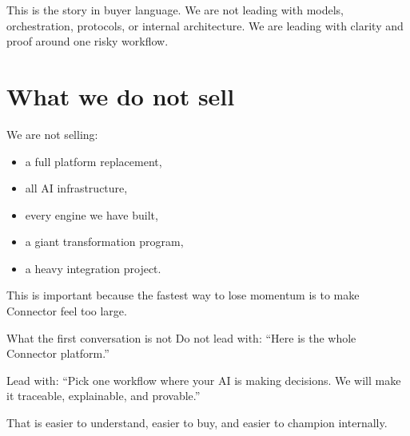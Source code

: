 This is the story in buyer language.
We are not leading with models, orchestration, protocols, or internal architecture.
We are leading with clarity and proof around one risky workflow.

\section{What we do not sell}

We are not selling:

\begin{itemize}
  \item a full platform replacement,
  \item all AI infrastructure,
  \item every engine we have built,
  \item a giant transformation program,
  \item a heavy integration project.
\end{itemize}

This is important because the fastest way to lose momentum is to make Connector feel too large.

\begin{warnbox}{What the first conversation is not}
Do not lead with: ``Here is the whole Connector platform.''

Lead with: ``Pick one workflow where your AI is making decisions. We will make it traceable, explainable, and provable.''
\end{warnbox}

That is easier to understand, easier to buy, and easier to champion internally.
